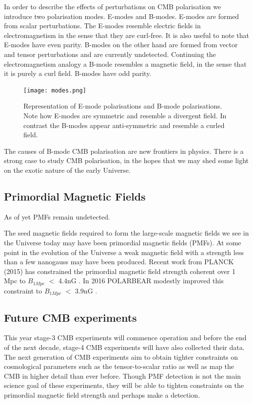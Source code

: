 In order to describe the effects of perturbations on CMB polarisation we introduce two polarisation modes. E-modes and B-modes. E-modes are formed from scalar perturbations. The E-modes resemble electric fields in electromagnetism in the sense that they are curl-free. It is also useful to note that E-modes have even parity. B-modes on the other hand are formed from vector and tensor perturbations and are currently undetected. Continuing the electromagnetism analogy a B-mode resembles a magnetic field, in the sense that it is purely a curl field. B-modes have odd parity.

\begin{figure}
\centering
\texttt{[image: modes.png]}
\caption{Representation of E-mode polarisations and B-mode polarisations. Note how E-modes are symmetric and resemble a divergent field. In contrast the B-modes appear anti-symmetric and resemble a curled field.}
\label{fig:modes}
\end{figure}

The causes of B-mode CMB polarisation are new frontiers in physics. There is a strong case to study CMB polarisation, in the hopes that we may shed some light on the exotic nature of the early Universe.

\subsection{Primordial Magnetic Fields}

As of yet PMFs remain undetected. 

The seed magnetic fields required to form the large-scale magnetic fields we see in the Universe today may have been primordial magnetic fields (PMFs). At some point in the evolution of the Universe a weak magnetic field with a strength less than a few nanogauss may have been produced. Recent work from PLANCK (2015) has constrained the primordial magnetic field strength coherent over 1 Mpc to $B_{1Mpc}$ $<$ 4.4nG \cite{Ade:2015cva}. In 2016 POLARBEAR modestly improved this constraint to $B_{1Mpc}$ $<$ 3.9nG \cite{Ade:2015cao}.

\subsection{Future CMB experiments}
This year stage-3 CMB experiments will commence operation and before the end of the next decade, stage-4 CMB experiments will have also collected their data. The next generation of CMB experiments aim to obtain tighter constraints on cosmological parameters such as the tensor-to-scalar ratio as well as map the CMB in higher detail than ever before. Though PMF detection is not the main science goal of these experiments, they will be able to tighten constraints on the primordial magnetic field strength and perhaps make a detection.

